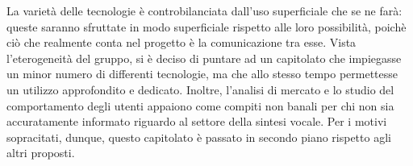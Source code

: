 La varietà delle tecnologie è controbilanciata dall'uso superficiale che se ne farà: queste saranno sfruttate in modo superficiale rispetto alle loro possibilità, poichè ciò che realmente conta nel progetto è la comunicazione tra esse. Vista l'eterogeneità del gruppo, si è deciso di puntare ad un capitolato che impiegasse un minor numero di differenti tecnologie, ma che allo stesso tempo permettesse un utilizzo approfondito e dedicato. Inoltre, l'analisi di mercato e lo studio del comportamento
degli utenti appaiono come compiti non banali per chi non sia accuratamente
informato riguardo al settore della sintesi vocale. Per i motivi sopracitati, dunque, questo capitolato è passato in secondo piano rispetto agli altri proposti.